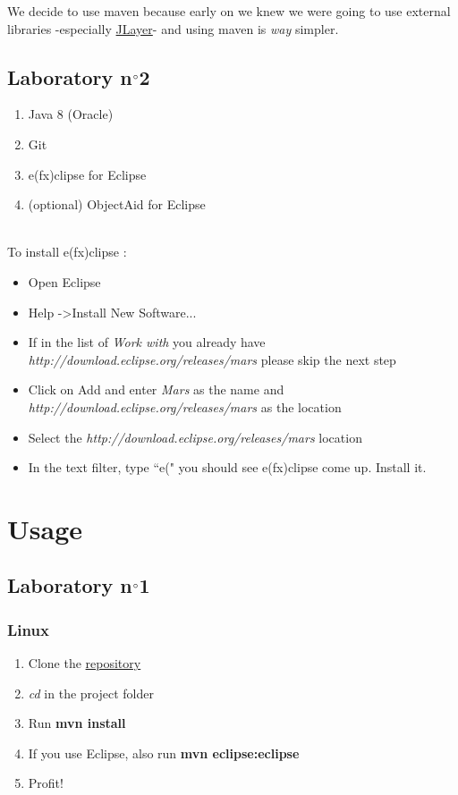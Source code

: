 \documentclass{report}
\begin{document}
We decide to use maven because early on we knew we were going to use external libraries -especially \href{http://www.javazoom.net/javalayer/javalayer.html}{JLayer}- and using maven is \textit{way} simpler.

\subsection{Laboratory n$\degree$2}

\begin{enumerate}
\item Java 8 (Oracle)
\item Git
\item e(fx)clipse for Eclipse
\item (optional) ObjectAid for Eclipse
\end{enumerate}

\ \\
To install e(fx)clipse :

\begin{itemize}
\item Open Eclipse
\item Help -\textgreater Install New Software...
\item If in the list of \textit{Work with} you already have \textit{http://download.eclipse.org/releases/mars} please skip the next step
\item Click on Add and enter \textit{Mars} as the name and \textit{http://download.eclipse.org/releases/mars} as the location
\item Select the \textit{http://download.eclipse.org/releases/mars} location
\item In the text filter, type ``e(" you should see e(fx)clipse come up. Install it.
\end{itemize}

\section{Usage}

\subsection{Laboratory n$\degree$1}

\subsubsection{Linux}

\begin{enumerate}
\item Clone the \href{https://github.com/cnamal/arch-LOG8430}{repository}
\item \textit{cd} in the project folder
\item Run \textbf{mvn install}
\item If you use Eclipse, also run \textbf{mvn eclipse:eclipse}
\item Profit!
\end{enumerate}
\end{document}
